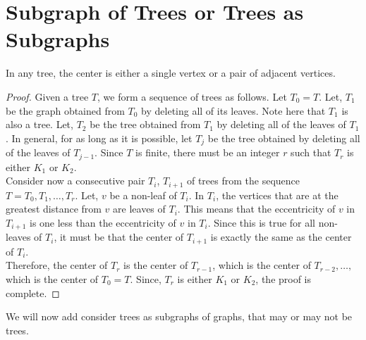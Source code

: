 \documentclass[../basic_graph_theory.tex]{subfiles}
\begin{document}
\section{Subgraph of Trees or Trees as Subgraphs}
\begin{Thm}{}{}
    In any tree, the center is either a single vertex or a pair of adjacent vertices.
\end{Thm}
\begin{proof}
    Given a tree $T$, we form a sequence of trees as follows. Let $T_0 = T$. Let, $T_1$ be the graph obtained from $T_0$ by deleting all of its leaves. Note here that $T_1$ is also a tree. Let, $T_2$ be the tree obtained from $T_1$ by deleting all of the leaves of $T_1$. In general, for as long as it is possible, let $T_j$ be the tree obtained by deleting all of the leaves of $T_{j-1}$. Since $T$ is finite, there must be an integer $r$ such that $T_r$ is either $K_1$ or $K_2$.\\
    Consider now a consecutive pair $T_i$, $T_{i+1}$ of trees from the sequence $T=T_0, T_1, \dots, T_r$. Let, $v$ be a non-leaf of $T_i$. In $T_i$, the vertices that are at the greatest distance from $v$ are leaves of $T_i$. This means that the eccentricity of $v$ in $T_{i+1}$ is one less than the eccentricity of $v$ in $T_i$. Since this is true for all non-leaves of $T_i$, it must be that the center of $T_{i+1}$ is exactly the same as the center of $T_i$.\\
    Therefore, the center of $T_r$ is the center of $T_{r-1}$, which is the center of $T_{r-2}, \dots, $ which is the center of $T_0=T$. Since, $T_r$ is either $K_1$ or $K_2$, the proof is complete.
\end{proof}

We will now add consider trees as subgraphs of graphs, that may or may not be trees.
\end{document}
